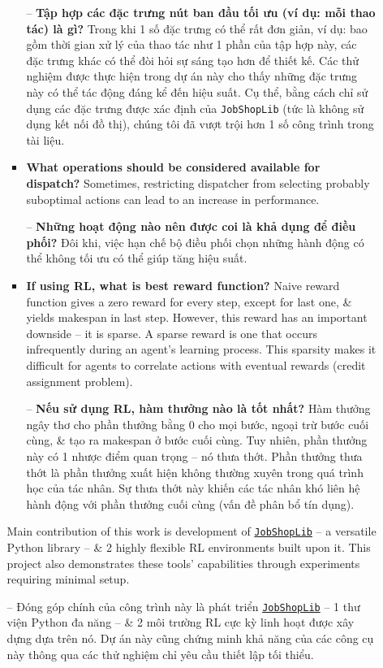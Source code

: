\documentclass{article}
\begin{document}
\begin{itemize}
\begin{itemize}
\begin{itemize}
            -- {\bf Tập hợp các đặc trưng nút ban đầu tối ưu (ví dụ: mỗi thao tác) là gì?} Trong khi 1 số đặc trưng có thể rất đơn giản, ví dụ: bao gồm thời gian xử lý của thao tác như 1 phần của tập hợp này, các đặc trưng khác có thể đòi hỏi sự sáng tạo hơn để thiết kế. Các thử nghiệm được thực hiện trong dự án này cho thấy những đặc trưng này có thể tác động đáng kể đến hiệu suất. Cụ thể, bằng cách chỉ sử dụng các đặc trưng được xác định của {\tt JobShopLib} (tức là không sử dụng kết nối đồ thị), chúng tôi đã vượt trội hơn 1 số công trình trong tài liệu.
            \item {\bf What operations should be considered available for dispatch?} Sometimes, restricting dispatcher from selecting probably suboptimal actions can lead to an increase in performance.

            -- {\bf Những hoạt động nào nên được coi là khả dụng để điều phối?} Đôi khi, việc hạn chế bộ điều phối chọn những hành động có thể không tối ưu có thể giúp tăng hiệu suất.
            \item {\bf If using RL, what is best reward function?} Naive reward function gives a zero reward for every step, except for last one, \& yields makespan in last step. However, this reward has an important downside -- it is sparse. A sparse reward is one that occurs infrequently during an agent's learning process. This sparsity makes it difficult for agents to correlate actions with eventual rewards (credit assignment problem).

            -- {\bf Nếu sử dụng RL, hàm thưởng nào là tốt nhất?} Hàm thưởng ngây thơ cho phần thưởng bằng 0 cho mọi bước, ngoại trừ bước cuối cùng, \& tạo ra makespan ở bước cuối cùng. Tuy nhiên, phần thưởng này có 1 nhược điểm quan trọng -- nó thưa thớt. Phần thưởng thưa thớt là phần thưởng xuất hiện không thường xuyên trong quá trình học của tác nhân. Sự thưa thớt này khiến các tác nhân khó liên hệ hành động với phần thưởng cuối cùng (vấn đề phân bổ tín dụng).
        \end{itemize}
        Main contribution of this work is development of \href{https://github.com/Pabloo22/job_shop_lib}{\tt JobShopLib} -- a versatile Python library -- \& 2 highly flexible RL environments built upon it. This project also demonstrates these tools' capabilities through experiments requiring minimal setup.

        -- Đóng góp chính của công trình này là phát triển \href{https://github.com/Pabloo22/job_shop_lib}{\tt JobShopLib} -- 1 thư viện Python đa năng -- \& 2 môi trường RL cực kỳ linh hoạt được xây dựng dựa trên nó. Dự án này cũng chứng minh khả năng của các công cụ này thông qua các thử nghiệm chỉ yêu cầu thiết lập tối thiểu.


\end{itemize}
\end{itemize}
\end{document}
